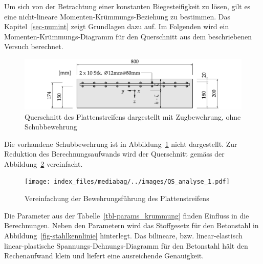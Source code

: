 \documentclass[
  12pt,
  letterpaper,
  egregdoesnotlikesansseriftitles]{scrreprt}
\begin{document}
Um sich von der Betrachtung einer konstanten Biegesteifigkeit zu lösen,
gilt es eine nicht-lineare Momenten-Krümmungs-Beziehung zu bestimmen.
Das Kapitel~\ref{sec-numint} zeigt Grundlagen dazu auf. Im Folgenden
wird ein Momenten-Krümmungs-Diagramm für den Querschnitt aus dem
beschriebenen Versuch berechnet.

\begin{figure}[H]

{\centering \includegraphics{index_files/mediabag/../images/QS_Versuch_A3.pdf}

}

\caption{\label{fig-qs_a3}Querschnitt des Plattenstreifens dargestellt
mit Zugbewehrung, ohne Schubbewehrung}

\end{figure}

Die vorhandene Schubbewehrung ist in Abbildung~\ref{fig-qs_a3} nicht
dargestellt. Zur Reduktion des Berechnungsaufwands wird der Querschnitt
gemäss der Abbildung~\ref{fig-qs_vereinfachung} vereinfacht.

\begin{figure}[H]

{\centering \texttt{[image: index\_files/mediabag/../images/QS\_analyse\_1.pdf]}

}

\caption{\label{fig-qs_vereinfachung}Vereinfachung der Bewehrungsführung
des Plattenstreifens}

\end{figure}

Die Parameter aus der Tabelle~\ref{tbl-params_krummung} finden Einfluss
in die Berechnungen. Neben den Parametern wird das Stoffgesetz für den
Betonstahl in Abbildung~\ref{fig-stahlkennlinie} hinterlegt. Das
bilineare, bzw. linear-elastisch linear-plastische
Spannungs-Dehnungs-Diagramm für den Betonstahl hält den Rechenaufwand
klein und liefert eine ausreichende Genauigkeit.
\end{document}
